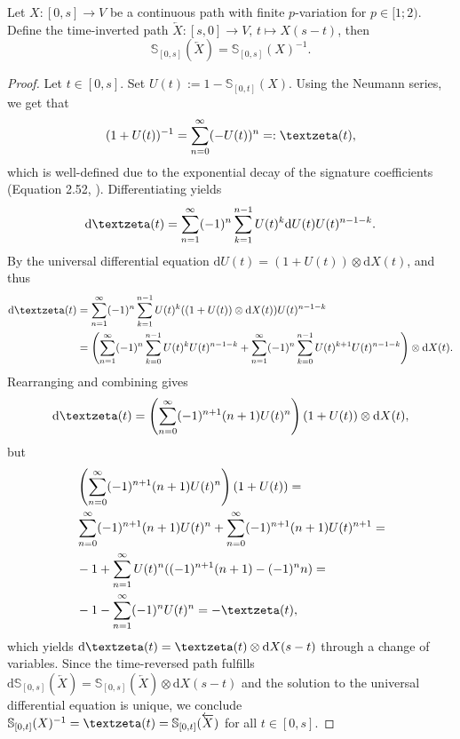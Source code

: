 \documentclass[openany]{book}
\begin{document}
\begin{theorem}
    Let $X:[0,s]\to V$ be a continuous path with finite $p$-variation for $p\in [1;2)$. Define the time-inverted path $\overleftarrow{X}:[s,0]\to V,\, t\mapsto X(s-t)$, then
    \begin{equation*}
        \mathbb S_{[0,s]}(\overleftarrow X)=\mathbb S_{[0,s]}(X)^{-1}.
    \end{equation*}
    \begin{proof}
        Let $t\in [0,s]$. Set $U(t):=1-\mathbb S_{[0,t]}(X)$. Using the Neumann series, we get that
        \begin{equation*}
            (1+U(t))^{-1}=\sum_{n=0}^\infty(-U(t))^n=:\gzeta(t),
        \end{equation*}
        which is well-defined due to the exponential decay of the signature coefficients (Equation 2.52, \cite{lyons2022}). Differentiating yields
        \begin{equation*}
        \mathrm{d}\gzeta(t)=\sum_{n=1}^\infty (-1)^n\sum_{k=1}^{n-1}U(t)^k\mathrm dU(t)U(t)^{n-1-k}.
        \end{equation*}
        By the universal differential equation $\mathrm dU(t)=(1+U(t))\otimes\mathrm dX(t)$, and thus
        \begin{equation*}
        \begin{split}
            \mathrm{d}\gzeta(t)&=\sum_{n=1}^\infty (-1)^n\sum_{k=1}^{n-1}U(t)^k((1+U(t))\otimes\mathrm dX(t))U(t)^{n-1-k} \\
            &=\left(\sum_{n=1}^\infty(-1)^n\sum_{k=0}^{n-1}U(t)^kU(t)^{n-1-k}+\sum_{n=1}^\infty(-1)^n\sum_{k=0}^{n-1}U(t)^{k+1}U(t)^{n-1-k}\right)\otimes \mathrm dX(t).
        \end{split}
        \end{equation*}
        Rearranging and combining gives
        \begin{equation*}
            \mathrm{d}\gzeta(t)=\left(\sum_{n=0}^\infty(-1)^{n+1}(n+1)U(t)^n\right)(1+U(t))\otimes \mathrm dX(t),
        \end{equation*}
        but 
        \begin{equation*}
        \begin{split}
            &\left(\sum_{n=0}^\infty(-1)^{n+1}(n+1)U(t)^n\right)(1+U(t))=
            \\ &\sum_{n=0}^\infty(-1)^{n+1}(n+1)U(t)^n+\sum_{n=0}^\infty(-1)^{n+1}(n+1)U(t)^{n+1}=
            \\&-1+\sum_{n=1}^\infty U(t)^n((-1)^{n+1}(n+1)-(-1)^nn)=
            \\&-1-\sum_{n=1}^\infty(-1)^nU(t)^{n}=-\gzeta(t),
        \end{split}
        \end{equation*}
        which yields $\mathrm d\gzeta(t)=\gzeta(t)\otimes \mathrm dX(s-t)$ through a change of variables. Since the time-reversed path fulfills $\mathrm d\mathbb S_{[0,s]}(\overleftarrow X)=\mathbb S_{[0,s]}(\overleftarrow X)\otimes \mathrm dX(s-t)$ and the solution to the universal differential equation is unique, we conclude $\mathbb S_{[0,t]}(X)^{-1}=\gzeta(t)=\mathbb S_{[0,t]}(\overleftarrow X)$ for all $t\in [0,s].$
    \end{proof}
\end{theorem}
\end{document}
